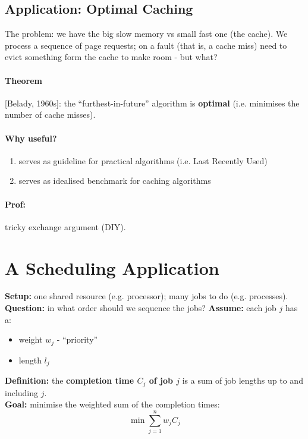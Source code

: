 \documentclass{scrartcl}
\begin{document}
\subsection{Application: Optimal Caching}
\label{sec:3-2}
The problem: we have the big slow memory vs small fast one (the cache). We
process a sequence of page requests; on a fault (that is, a cache miss) need to
evict something form the cache to make room - but what?

\paragraph{Theorem} [Belady, 1960s]: the ``furthest-in-future'' algorithm is
{\bf optimal} (i.e. minimises the number of cache misses).

\paragraph{Why useful?}
\begin{enumerate}
\item serves as guideline for practical algorithms (i.e. Last Recently Used)
\item serves as idealised benchmark for caching algorithms
\end{enumerate}
\paragraph{Prof:} tricky exchange argument (DIY).

\section{A Scheduling Application}
\label{sec:4-0} {\bf Setup:} one shared resource (e.g. processor); many jobs to
do (e.g.
processes).\\
{\bf Question:} in what order should we sequence the jobs? {\bf Assume:} each
job $j$ has a:
\begin{itemize}
\item weight $w_j$ - ``priority''
\item length $l_j$
\end{itemize} {\bf Definition:} the {\bf completion time $C_j$ of job $j$} is a
sum
of job lengths up to and including $j$.\\
{\bf Goal:} minimise the weighted sum of the completion times:
$$ \min \sum_{j=1}^n w_jC_j $$

\end{document}
